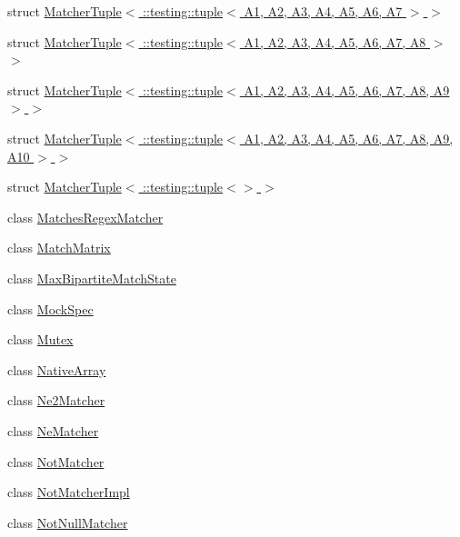 \begin{DoxyCompactItemize}
\item 
struct \hyperlink{structtesting_1_1internal_1_1MatcherTuple_3_01_1_1testing_1_1tuple_3_01A1_00_01A2_00_01A3_00_01A63c742e825c64dbe2671b0a407b3db47}{Matcher\+Tuple$<$ \+::testing\+::tuple$<$ A1, A2, A3, A4, A5, A6, A7 $>$ $>$}
\item 
struct \hyperlink{structtesting_1_1internal_1_1MatcherTuple_3_01_1_1testing_1_1tuple_3_01A1_00_01A2_00_01A3_00_01Aed2bba98e2ef5f11a8df3506707ec6d8}{Matcher\+Tuple$<$ \+::testing\+::tuple$<$ A1, A2, A3, A4, A5, A6, A7, A8 $>$ $>$}
\item 
struct \hyperlink{structtesting_1_1internal_1_1MatcherTuple_3_01_1_1testing_1_1tuple_3_01A1_00_01A2_00_01A3_00_01Aa73012c63a4e11ec83732b0fb70972c7}{Matcher\+Tuple$<$ \+::testing\+::tuple$<$ A1, A2, A3, A4, A5, A6, A7, A8, A9 $>$ $>$}
\item 
struct \hyperlink{structtesting_1_1internal_1_1MatcherTuple_3_01_1_1testing_1_1tuple_3_01A1_00_01A2_00_01A3_00_01Aa256ea461b02eca0db9561b7bbf2c82d}{Matcher\+Tuple$<$ \+::testing\+::tuple$<$ A1, A2, A3, A4, A5, A6, A7, A8, A9, A10 $>$ $>$}
\item 
struct \hyperlink{structtesting_1_1internal_1_1MatcherTuple_3_01_1_1testing_1_1tuple_3_4_01_4}{Matcher\+Tuple$<$ \+::testing\+::tuple$<$$>$ $>$}
\item 
class \hyperlink{classtesting_1_1internal_1_1MatchesRegexMatcher}{Matches\+Regex\+Matcher}
\item 
class \hyperlink{classtesting_1_1internal_1_1MatchMatrix}{Match\+Matrix}
\item 
class \hyperlink{classtesting_1_1internal_1_1MaxBipartiteMatchState}{Max\+Bipartite\+Match\+State}
\item 
class \hyperlink{classtesting_1_1internal_1_1MockSpec}{Mock\+Spec}
\item 
class \hyperlink{classtesting_1_1internal_1_1Mutex}{Mutex}
\item 
class \hyperlink{classtesting_1_1internal_1_1NativeArray}{Native\+Array}
\item 
class \hyperlink{classtesting_1_1internal_1_1Ne2Matcher}{Ne2\+Matcher}
\item 
class \hyperlink{classtesting_1_1internal_1_1NeMatcher}{Ne\+Matcher}
\item 
class \hyperlink{classtesting_1_1internal_1_1NotMatcher}{Not\+Matcher}
\item 
class \hyperlink{classtesting_1_1internal_1_1NotMatcherImpl}{Not\+Matcher\+Impl}
\item 
class \hyperlink{classtesting_1_1internal_1_1NotNullMatcher}{Not\+Null\+Matcher}

\end{DoxyCompactItemize}
